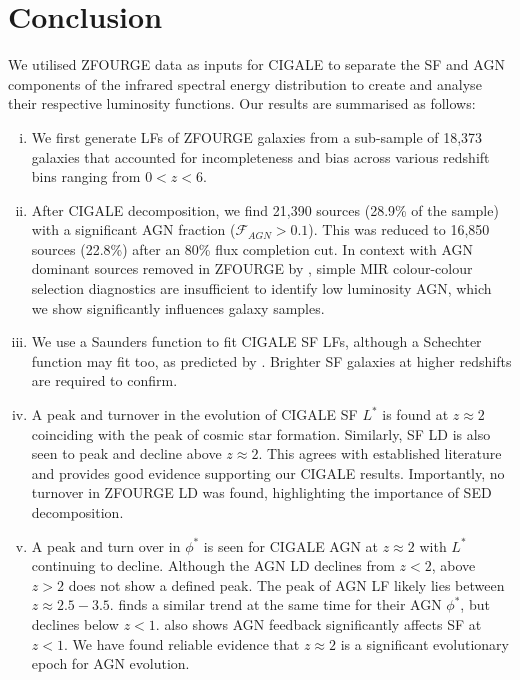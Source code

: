 \section{Conclusion}

We utilised ZFOURGE data as inputs for CIGALE to separate the SF and AGN components of the infrared spectral energy distribution to create and analyse their respective luminosity functions. Our results are summarised as follows:

\begin{enumerate}[(i)]
    \item We first generate LFs of ZFOURGE galaxies from a sub-sample of 18,373 galaxies that accounted for incompleteness and bias across various redshift bins ranging from $0<z<6$.
    
    \item After CIGALE decomposition, we find 21,390 sources (28.9\% of the sample) with a significant AGN fraction ($\mathcal{F}_{AGN} > 0.1$). This was reduced to 16,850 sources (22.8\%) after an 80\% flux completion cut. In context with AGN dominant sources removed in ZFOURGE by \cite{cowley_zfourge_2016}, simple MIR colour-colour selection diagnostics are insufficient to identify low luminosity AGN, which we show significantly influences galaxy samples.
    
    \item We use a Saunders function to fit CIGALE SF LFs, although a Schechter function may fit too, as predicted by \cite{wu_mid-infrared_2011, fu_decomposing_2010}. Brighter SF galaxies at higher redshifts are required to confirm. 

    \item A peak and turnover in the evolution of CIGALE SF $L^{*}$ is found at $z \approx 2$ coinciding with the peak of cosmic star formation. Similarly, SF LD is also seen to peak and decline above $z\approx2$. This agrees with established literature and provides good evidence supporting our CIGALE results. Importantly, no turnover in ZFOURGE LD was found, highlighting the importance of SED decomposition.
    
    \item A peak and turn over in $\phi^{*}$ is seen for CIGALE AGN at $z \approx 2$ with $L^{*}$ continuing to decline. Although the AGN LD declines from $z<2$, above $z>2$ does not show a defined peak. The peak of AGN LF likely lies between $z\approx2.5-3.5$. \cite{delvecchio_tracing_2014} finds a similar trend at the same time for their AGN $\phi^{*}$, but declines below $z<1$. \cite{katsianis_evolution_2017} also shows AGN feedback significantly affects SF at $z<1$. We have found reliable evidence that $z\approx2$ is a significant evolutionary epoch for AGN evolution. 
    

\end{enumerate}
